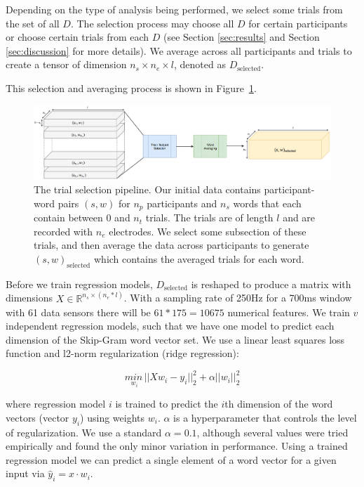 Depending on the type of analysis being performed, we select some trials from the set of all $D$. The selection process may choose all $D$ for certain participants or choose certain trials from each $D$ (see Section \ref{sec:results} and Section \ref{sec:discussion} for more details). We average across all participants and trials to create a tensor of dimension $n_s \times n_e \times l$, denoted as $D_\text{selected}$.  

This selection and averaging process is shown in Figure~\ref{fig:selection}.

\begin{figure}[t]
 \centerline{
   \includegraphics[width=1.5\linewidth]{figures/selection}
 }
 \caption{The trial selection pipeline. Our initial data contains participant-word pairs $(s, w)$ for $n_p$ participants and $n_s$ words that each contain between 0 and $n_t$ trials. The trials are of length $l$ and are recorded with $n_e$ electrodes. We select some subsection of these trials, and then average the data across participants to generate $(s, w)_{\text{selected}}$ which contains the averaged trials for each word.}
 \label{fig:selection}
\end{figure}

Before we train regression models, $D_{\text{selected}}$ is reshaped to produce a matrix with dimensions $X \in \mathbb{R}^{n_s \times (n_e * l)}$.  With a sampling rate of 250Hz for a 700ms window with 61 data sensors there will be $61*175 = 10675$ numerical features. We train $v$ independent regression models, such that we have one model to predict each dimension of the Skip-Gram word vector set. We use a linear least squares loss function and l2-norm regularization (ridge regression):

\begin{equation}
  \underset{w_i}{min\,} {|| X w_i - y_i||_2^2 + \alpha ||w_i||_2^2}
  \label{eq:ridge}
\end{equation}

\noindent where regression model $i$ is trained to predict the $i$th dimension of the word vectors (vector $y_i$) using weights $w_i$. $\alpha$ is a hyperparameter that controls the level of regularization. We use a standard $\alpha = 0.1$, although several values were tried empirically and found the only minor variation in performance. Using a trained regression model we can predict a single element of a word vector for a given input via $\hat{y}_i = x \cdot w_i$.

